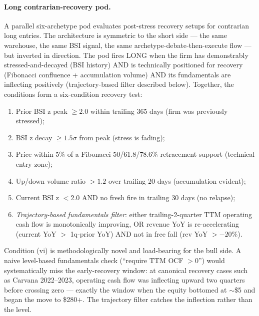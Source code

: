 \documentclass[11pt,a4paper]{article}
\begin{document}
\paragraph{Long contrarian-recovery pod.} A parallel six-archetype pod evaluates post-stress recovery setups for contrarian long entries. The architecture is symmetric to the short side --- the same warehouse, the same BSI signal, the same archetype-debate-then-execute flow --- but inverted in direction. The pod fires LONG when the firm has demonstrably stressed-and-decayed (BSI history) AND is technically positioned for recovery (Fibonacci confluence + accumulation volume) AND its fundamentals are inflecting positively (trajectory-based filter described below). Together, the conditions form a six-condition recovery test:
\begin{enumerate}
\item Prior BSI z peak $\ge 2.0$ within trailing 365 days (firm was previously stressed);
\item BSI z decay $\ge 1.5\sigma$ from peak (stress is fading);
\item Price within 5\% of a Fibonacci 50/61.8/78.6\% retracement support (technical entry zone);
\item Up/down volume ratio $> 1.2$ over trailing 20 days (accumulation evident);
\item Current BSI z $< 2.0$ AND no fresh fire in trailing 30 days (no relapse);
\item \emph{Trajectory-based fundamentals filter}: either trailing-2-quarter TTM operating cash flow is monotonically improving, OR revenue YoY is re-accelerating (current YoY $>$ 1q-prior YoY) AND not in free fall (rev YoY $> -20\%$).
\end{enumerate}
Condition (vi) is methodologically novel and load-bearing for the bull side. A naive level-based fundamentals check (``require TTM OCF $> 0$'') would systematically miss the early-recovery window: at canonical recovery cases such as Carvana 2022--2023, operating cash flow was inflecting upward two quarters before crossing zero --- exactly the window when the equity bottomed at $\sim$\$5 and began the move to \$280$+$. The trajectory filter catches the inflection rather than the level.
\end{document}
